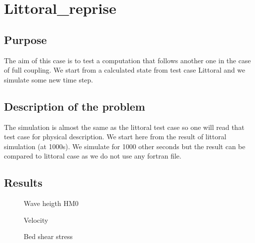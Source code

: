 \chapter{Littoral\_reprise}

\section{Purpose}
%
The aim of this case is to test a computation that follows another one in the case of full coupling. We start from a calculated state from test case Littoral and we simulate some new time step. 
%
\section{Description of the problem}
%
The simulation is almost the same as the littoral test case so one will read that test case for physical description. We start here from the result of littoral simulation (at 1000s). 
We simulate for 1000 other seconds but the result can be compared to littoral case as we do not use any fortran file. 


\section{Results}
\begin{figure} [!h]
\centering
{}
 \caption{Wave heigth HM0}
\label{resnextTOM}
\end{figure}
\begin{figure} [!h]
\centering
{}
 \caption{Velocity}
 \label{resnextT2D}
\end{figure}
\begin{figure} [!h]
\centering
{}
 \caption{Bed shear stress}
 \label{resnextT2D}
\end{figure}
